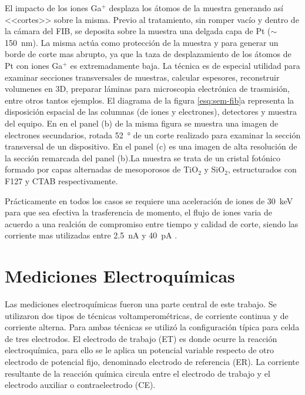 		El impacto de los iones Ga${^+}$ desplaza los átomos de la muestra generando así <<cortes>> sobre la misma. Previo al tratamiento, sin romper vacío y dentro de la cámara del FIB, se deposita sobre la muestra una delgada capa de Pt ($\sim$\SI{150}{\nm}). La misma actúa como protección de la muestra y para generar un borde de corte mas abrupto, ya que la taza de desplazamiento de los átomos de Pt con iones Ga${^+}$ es extremadamente baja.\cite{Giannuzzi2005,Orloff1996} La técnica es de especial utilidad para examinar secciones transversales de muestras, calcular espesores, reconstruir volumenes en 3D, preparar láminas para microscopia electrónica de trasmisión, entre otros tantos ejemplos. El diagrama de la figura \ref{esq:sem-fib}a representa la disposición espacial de las columnas (de iones y electrones), detectores y muestra del equipo. En en el panel (b) de la misma figura se muestra una imagen de electrones secundarios, rotada \SI{52}{\degree} de un corte realizado para examinar la sección transversal de un dispositivo. En el panel (c) es una imagen de alta resolución de la sección remarcada del panel (b).La muestra se trata de un cristal fotónico formado por capas alternadas de mesoporosos de TiO$_2$ y SiO$_2$, estructurados con F127 y CTAB respectivamente.\cite{Gimenez2017}

		Prácticamente en todos los casos se requiere una aceleración de iones de \SI{30}{\kilo\electronvolt} para que sea efectiva la trasferencia de momento, el flujo de iones varia de acuerdo a una realción de compromiso entre tiempo y calidad de corte, siendo las corriente mas utilizadas entre \SI{2.5}{\nano\ampere} y \SI{40}{\pico\ampere} \cite{Orloff2003,Reyntjens2001}.
	
\section{Mediciones Electroquímicas}\label{sec:medidas_eq}
		
			Las mediciones electroquímicas fueron una parte central de este trabajo. Se utilizaron dos tipos de técnicas voltamperométricas, de corriente continua y de corriente alterna. 	%
			Para ambas técnicas se utilizó la configuración típica para celda de tres electrodos.\cite{Wi2000} El electrodo de trabajo (ET) es donde ocurre la reacción electroquímica, para ello se le aplica un potencial variable respecto de otro electrodo de potencial fijo, denominado electrodo de referencia (ER). La corriente resultante de la reacción química circula entre el electrodo de trabajo y el electrodo auxiliar o contraelectrodo (CE). 

